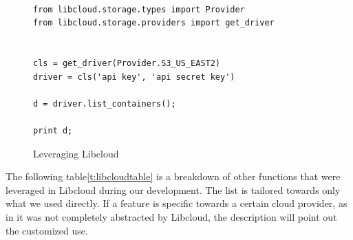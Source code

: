 \begin{figure}[htb]

\begin{verbatim}

from libcloud.storage.types import Provider
from libcloud.storage.providers import get_driver


cls = get_driver(Provider.S3_US_EAST2)
driver = cls('api key', 'api secret key')

d = driver.list_containers();

print d;

\end{verbatim}

\caption{Leveraging Libcloud
~\cite{hid-sp18-518-LibCloud}}\label{c:libcloud-example}

\end{figure}

The following table\ref{t:libcloudtable} is a breakdown of other functions
that were leveraged in
Libcloud during our development. The list is tailored towards only what we used
directly. If a feature is specific towards a certain cloud provider, as in it
was not completely abstracted by Libcloud, the description will point out the
customized use.

